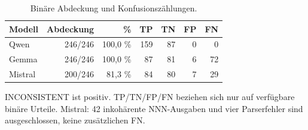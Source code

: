 \begin{table}[htbp]
\centering\small
\caption{Binäre Abdeckung und Konfusionszählungen.}
\label{tab_v2_binary}
\begin{tabular}{lrrrrrr}
\toprule
Modell & Abdeckung & \% & TP & TN & FP & FN \\
\midrule
Qwen & 246/246 & 100,0 \% & 159 & 87 & 0 & 0 \\
Gemma & 246/246 & 100,0 \% & 87 & 81 & 6 & 72 \\
Mistral & 200/246 & 81,3 \% & 84 & 80 & 7 & 29 \\
\bottomrule
\end{tabular}
\par\smallskip\noindent
\begin{minipage}{\linewidth}\footnotesize INCONSISTENT ist positiv. TP/TN/FP/FN beziehen sich nur auf verfügbare binäre Urteile. Mistral: 42 inkohärente NNN-Ausgaben und vier Parserfehler sind ausgeschlossen, keine zusätzlichen FN.\end{minipage}
\end{table}
